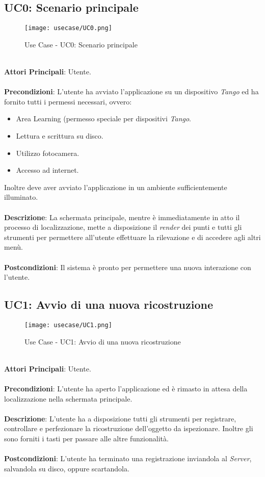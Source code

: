 \subsection{UC0: Scenario principale}
\begin{figure}[!h] 
    \centering 
    \texttt{[image: usecase/UC0.png]} 
    \caption{Use Case - UC0: Scenario principale}
\end{figure}
\ \\
\textbf{Attori Principali}: Utente.
\\\\ \textbf{Precondizioni}: L'utente ha avviato l'applicazione su un dispositivo \emph{Tango} ed ha fornito tutti i permessi necessari, ovvero:
\begin{itemize}
	\item Area Learning (permesso speciale per dispositivi \emph{Tango}.
	\item Lettura e scrittura su disco.
	\item Utilizzo fotocamera.
	\item Accesso ad internet.
\end{itemize}
Inoltre deve aver avviato l'applicazione in un ambiente sufficientemente illuminato.
\\\\ \textbf{Descrizione}: La schermata principale, mentre è immediatamente in atto il processo di localizzazione, mette a disposizione il \emph{render} dei punti e tutti gli strumenti per permettere all'utente effettuare la rilevazione e di accedere agli altri menù.
\\\\ \textbf{Postcondizioni}: Il sistema è pronto per permettere una nuova interazione con l'utente.


\subsection{UC1: Avvio di una nuova ricostruzione}
\begin{figure}[!h] 
    \centering 
    \texttt{[image: usecase/UC1.png]} 
    \caption{Use Case - UC1: Avvio di una nuova ricostruzione}
\end{figure}
\ \\
\textbf{Attori Principali}: Utente.
\\\\ \textbf{Precondizioni}: L'utente ha aperto l'applicazione ed è rimasto in attesa della localizzazione nella schermata principale.
\\\\ \textbf{Descrizione}: L'utente ha a disposizione tutti gli strumenti per registrare, controllare e perfezionare la ricostruzione dell'oggetto da ispezionare. Inoltre gli sono forniti i tasti per passare alle altre funzionalità. 
\\\\ \textbf{Postcondizioni}: L'utente ha terminato una registrazione inviandola al \emph{Server}, salvandola su disco, oppure scartandola.




